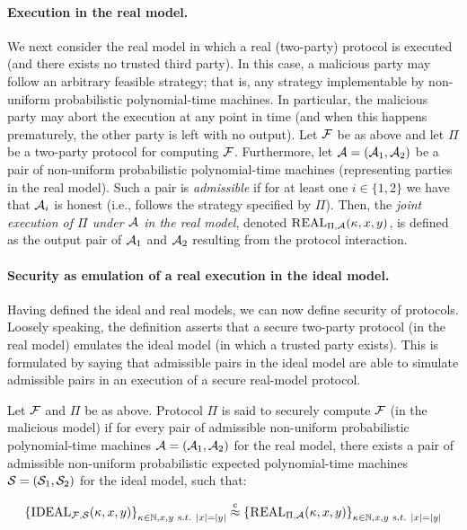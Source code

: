 \paragraph{Execution in the real model.} We next consider the real model in which a real (two-party)
protocol is executed (and there exists no trusted third party). In this case, a malicious party
may follow an arbitrary feasible strategy; that is, any strategy implementable by non-uniform
probabilistic polynomial-time machines. In particular, the malicious party may abort the execution
at any point in time (and when this happens prematurely, the other party is left with no output).
Let $\mathbf{\mathcal{F}}$ be as above and let $\Pi$ be a two-party protocol for computing $\mathbf{\mathcal{F}}$. Furthermore, let ${\cal A} =
({\cal A}_1, {\cal A}_2)$ be a pair of non-uniform probabilistic polynomial-time machines (representing parties in
the real model). Such a pair is {\em admissible} if for at least one $i \in \{1, 2\}$ we have that ${\cal A}_i$
is honest (i.e., follows the strategy specified by $\Pi$). Then, the {\em joint execution of $\Pi$ under ${\cal A}$ in the real model}, denoted $\mbox{\textsc REAL}_{\Pi,{\cal A}}(\kappa,x,y)$, is defined as the output pair of ${\cal A}_1$ and ${\cal A}_2$ resulting
from the protocol interaction.

\paragraph{Security as emulation of a real execution in the ideal model.} Having defined the ideal
and real models, we can now define security of protocols. Loosely speaking, the definition asserts
that a secure two-party protocol (in the real model) emulates the ideal model (in which a trusted
party exists). This is formulated by saying that admissible pairs in the ideal model are able to
simulate admissible pairs in an execution of a secure real-model protocol.



 Let $\mathbf{\mathcal{F}}$ and $\Pi$ be as above. Protocol $\Pi$ is said to
securely compute $\mathbf{\mathcal{F}}$ (in the malicious model) if for every pair of admissible non-uniform probabilistic
polynomial-time machines ${\cal A} =
({\cal A}_1, {\cal A}_2)$ for the real model, there exists a pair of admissible non-uniform
probabilistic expected polynomial-time machines ${\cal S} =({\cal S}_1, {\cal S}_2)$  for the ideal model, such that:

$$
\left\{\mbox{\textsc IDEAL}_{\mathbf{\mathcal{F}},{\cal S}}(\kappa,x,y)\right\}_{\kappa\in\mathbb{N},x,y ~{\text  s.t. } ~|x|=|y|} \stackrel{\rm c}{\approx}
\left\{\mbox{\textsc REAL}_{\Pi,{\cal A}}(\kappa,x,y)\right\}_{\kappa\in\mathbb{N},x,y ~{\text  s.t. } ~|x|=|y|}
$$

